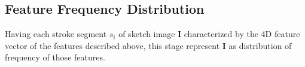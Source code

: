 %


\vspace{-4mm}
\subsection{Feature Frequency Distribution} \label{subsec: featureExtraction}
Having each stroke segment $s_i$ of sketch image $\mathbf{I}$ characterized by the 4D feature vector of the features described above, 
this stage represent $\mathbf{I}$ as distribution of frequency of those features.


